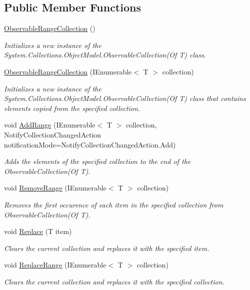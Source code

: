 \subsection*{Public Member Functions}
\begin{DoxyCompactItemize}
\item 
\hyperlink{class_pocket_saver_1_1_helpers_1_1_observable_range_collection_a4d5992476c0c7143f8494dac1ab67b62}{Observable\+Range\+Collection} ()
\begin{DoxyCompactList}\small\item\em Initializes a new instance of the System.\+Collections.\+Object\+Model.\+Observable\+Collection(\+Of T) class. \end{DoxyCompactList}\item 
\hyperlink{class_pocket_saver_1_1_helpers_1_1_observable_range_collection_a20abe6e4757c17478a850e16bf32c28c}{Observable\+Range\+Collection} (I\+Enumerable$<$ T $>$ collection)
\begin{DoxyCompactList}\small\item\em Initializes a new instance of the System.\+Collections.\+Object\+Model.\+Observable\+Collection(\+Of T) class that contains elements copied from the specified collection. \end{DoxyCompactList}\item 
void \hyperlink{class_pocket_saver_1_1_helpers_1_1_observable_range_collection_ae9693a07699c4573faa9bca6bc291de2}{Add\+Range} (I\+Enumerable$<$ T $>$ collection, Notify\+Collection\+Changed\+Action notification\+Mode=Notify\+Collection\+Changed\+Action.\+Add)
\begin{DoxyCompactList}\small\item\em Adds the elements of the specified collection to the end of the Observable\+Collection(\+Of T). \end{DoxyCompactList}\item 
void \hyperlink{class_pocket_saver_1_1_helpers_1_1_observable_range_collection_a3d2e4bb0b0fb26b3dde6b1419cf46daa}{Remove\+Range} (I\+Enumerable$<$ T $>$ collection)
\begin{DoxyCompactList}\small\item\em Removes the first occurence of each item in the specified collection from Observable\+Collection(\+Of T). \end{DoxyCompactList}\item 
void \hyperlink{class_pocket_saver_1_1_helpers_1_1_observable_range_collection_a238e1f431d4b2ee17a29b51b0a4b0dc8}{Replace} (T item)
\begin{DoxyCompactList}\small\item\em Clears the current collection and replaces it with the specified item. \end{DoxyCompactList}\item 
void \hyperlink{class_pocket_saver_1_1_helpers_1_1_observable_range_collection_ac324fbc1de2bad4abe3c31252e94277f}{Replace\+Range} (I\+Enumerable$<$ T $>$ collection)
\begin{DoxyCompactList}\small\item\em Clears the current collection and replaces it with the specified collection. \end{DoxyCompactList}\end{DoxyCompactItemize}
